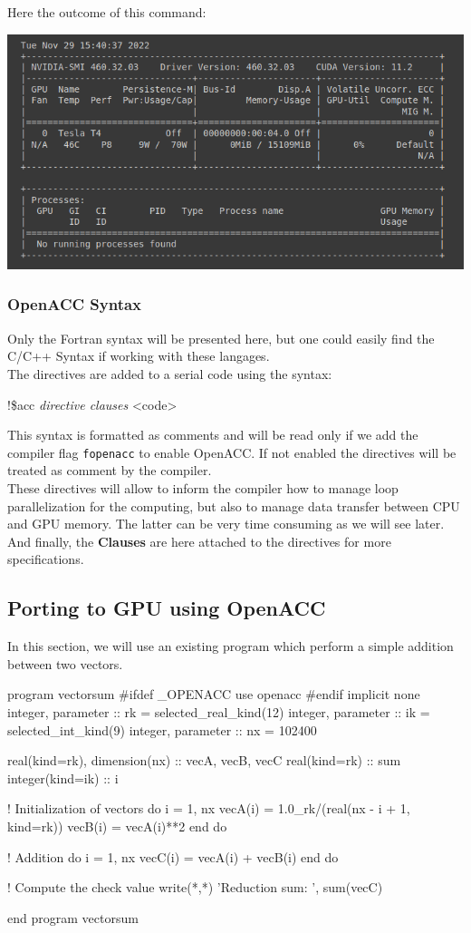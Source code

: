 \documentclass[10pt,a4paper]{article}
\newcommand{\code}[1]{\colorbox{light-gray}{\texttt{#1}}}
\begin{document}
Here the outcome of this command:
\begin{center}
\includegraphics[scale=0.5]{nvidiasmi.png}
\end{center}

\subsubsection{OpenACC Syntax}
Only the Fortran syntax will be presented here, but one could easily find the C/C++ Syntax if working with these langages.\\
The directives are added to a serial code using the syntax:
\begin{mylisting}
!\$acc \textit{directive clauses}
<code>
\end{mylisting}
This syntax is formatted as comments and will be read only if we add the compiler flag \code{fopenacc} to enable OpenACC. If not enabled the directives will be treated as comment by the compiler.\\
These directives will allow to inform the compiler how to manage loop parallelization for the computing, but also to manage data transfer between CPU and GPU memory. The latter can be very time consuming as we will see later. \\
And finally, the \textbf{Clauses} are here attached to the directives for more specifications. 


\subsection{Porting to GPU using OpenACC}
In this section, we will use an existing program which perform a simple addition between two vectors.
\begin{mylisting}
program vectorsum
#ifdef _OPENACC
  use openacc
#endif
  implicit none
  integer, parameter :: rk = selected_real_kind(12)
  integer, parameter :: ik = selected_int_kind(9)
  integer, parameter :: nx = 102400

  real(kind=rk), dimension(nx) :: vecA, vecB, vecC
  real(kind=rk)    :: sum
  integer(kind=ik) :: i

  ! Initialization of vectors
  do i = 1, nx
     vecA(i) = 1.0_rk/(real(nx - i + 1, kind=rk))
     vecB(i) = vecA(i)**2
  end do

  ! Addition
  do i = 1, nx
     vecC(i) = vecA(i) + vecB(i)
  end do

  ! Compute the check value
  write(*,*) 'Reduction sum: ', sum(vecC)
  
end program vectorsum
\end{mylisting}
\end{document}

